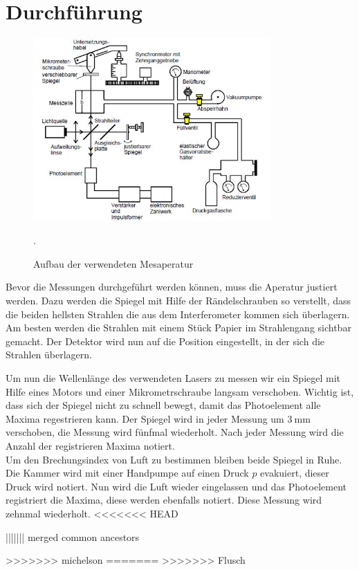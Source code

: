 
\section{Durchführung}
\begin{figure}[H]
  \centering
  \includegraphics[height=7cm]{aufbau.JPG}
  \caption{Aufbau der verwendeten Mesaperatur}
  \label{fig:aufbau}
  \cite{skript}.
\end{figure}
Bevor die Messungen durchgeführt werden können, muss die Aperatur justiert werden.
Dazu werden die Spiegel mit Hilfe der Rändelschrauben so verstellt, dass die beiden hellsten
Strahlen die aus dem Interferometer kommen sich überlagern. Am besten werden die Strahlen mit
einem Stück Papier im Strahlengang sichtbar gemacht. Der Detektor wird nun auf die
Position eingestellt, in der sich die Strahlen überlagern.

Um nun die Wellenlänge des verwendeten Lasers zu messen wir ein Spiegel mit Hilfe eines Motors
und einer Mikrometrschraube langsam verschoben. Wichtig ist, dass sich der Spiegel nicht zu schnell
bewegt, damit das Photoelement alle Maxima regestrieren kann. Der Spiegel wird in jeder
Messung um $\SI{3}{\mm}$ verschoben, die Messung wird fünfmal wiederholt. Nach jeder Messung
wird die Anzahl der registrieren Maxima notiert.\\
Um den Brechungsindex von Luft zu bestimmen bleiben beide Spiegel in Ruhe.
Die Kammer wird mit einer Handpumpe auf einen Druck $p$ evakuiert, dieser Druck wird notiert.
Nun wird die Luft wieder eingelassen und das Photoelement registriert die Maxima, diese werden
ebenfalls notiert. Diese Messung wird zehnmal wiederholt.
<<<<<<< HEAD



\label{sec:Durchführung}
||||||| merged common ancestors



\label{sec:Durchführung}
>>>>>>> michelson
=======
>>>>>>> Flusch
